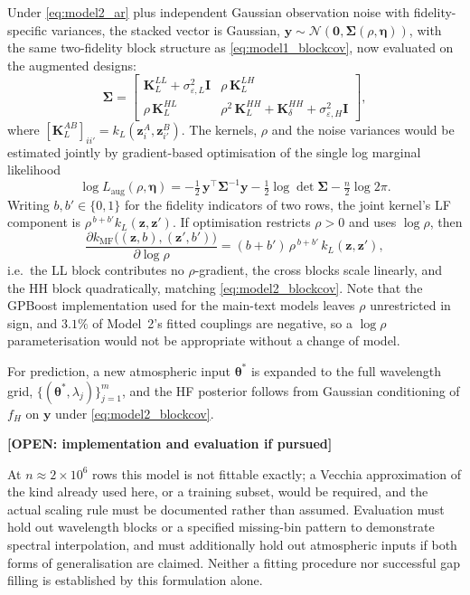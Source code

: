 \documentclass[12pt, letterpaper, oneside]{article}
\newcommand{\openitem}[2]{\par\begingroup\small\color{red!65!black}%
\noindent\textbf{[OPEN: #1]}\par\nobreak\noindent #2\par\endgroup}
\begin{document}
Under \eqref{eq:model2_ar} plus independent Gaussian observation noise with
fidelity-specific variances, the stacked vector is Gaussian,
$\mathbf{y}\sim\mathcal{N}(\mathbf 0,\bm\Sigma(\rho,\bm\eta))$, with the same
two-fidelity block structure as \eqref{eq:model1_blockcov}, now evaluated on
the augmented designs:
\begin{equation}
    \bm\Sigma =
    \begin{bmatrix}
        \mathbf{K}_{L}^{LL} + \sigma^{2}_{\varepsilon,L}\mathbf{I}
        & \rho\,\mathbf{K}_{L}^{LH} \\[4pt]
        \rho\,\mathbf{K}_{L}^{HL}
        & \rho^{2}\,\mathbf{K}_{L}^{HH}
          + \mathbf{K}_{\delta}^{HH}
          + \sigma^{2}_{\varepsilon,H}\mathbf{I}
    \end{bmatrix},
    \label{eq:model2_blockcov}
\end{equation}
where $[\mathbf{K}_{L}^{AB}]_{ii'}=k_L(\mathbf z_i^A,\mathbf z_{i'}^B)$. The
kernels, $\rho$ and the noise variances would be estimated jointly by
gradient-based optimisation of the single log marginal likelihood
\begin{equation}
    \log L_{\mathrm{aug}}(\rho,\bm\eta)
    = -\tfrac{1}{2}\,\mathbf{y}^{\top}\bm\Sigma^{-1}\mathbf{y}
      -\tfrac{1}{2}\log\det\bm\Sigma
      -\tfrac{n}{2}\log 2\pi .
    \label{eq:model2_lml}
\end{equation}
Writing $b,b'\in\{0,1\}$ for the fidelity indicators of two rows, the joint
kernel's LF component is $\rho^{\,b+b'}k_{L}(\mathbf{z},\mathbf{z}')$. If
optimisation restricts $\rho>0$ and uses $\log\rho$, then
\begin{equation}
    \frac{\partial k_{\mathrm{MF}}\bigl((\mathbf{z},b),(\mathbf{z}',b')\bigr)}{\partial \log\rho}
    = (b+b')\,\rho^{\,b+b'}\,k_{L}(\mathbf{z},\mathbf{z}'),
    \label{eq:model2_rho_grad}
\end{equation}
i.e.\ the LL block contributes no $\rho$-gradient, the cross blocks scale
linearly, and the HH block quadratically, matching
\eqref{eq:model2_blockcov}. Note that the GPBoost implementation used for the
main-text models leaves $\rho$ unrestricted in sign, and $3.1\%$ of Model~2's
fitted couplings are negative, so a $\log\rho$ parameterisation would not be
appropriate without a change of model.

For prediction, a new atmospheric input $\bm\theta^{*}$ is expanded to the full
wavelength grid, $\{(\bm\theta^{*},\lambda_{j})\}_{j=1}^{m}$, and the HF
posterior follows from Gaussian conditioning of $f_H$ on $\mathbf{y}$ under
\eqref{eq:model2_blockcov}.

\openitem{implementation and evaluation if pursued}{At $n\approx2\times10^{6}$
rows this model is not fittable exactly; a Vecchia approximation of the kind
already used here, or a training subset, would be required, and the actual
scaling rule must be documented rather than assumed. Evaluation must hold out
wavelength blocks or a specified missing-bin pattern to demonstrate spectral
interpolation, and must additionally hold out atmospheric inputs if both forms
of generalisation are claimed. Neither a fitting procedure nor successful gap
filling is established by this formulation alone.}
\end{document}
